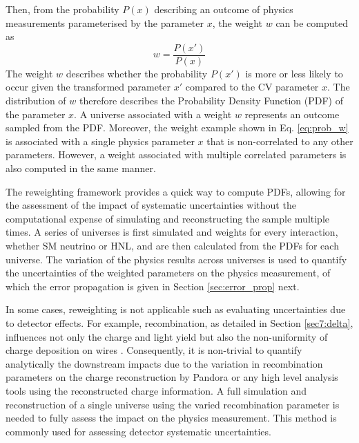 
Then, from the probability $P(x)$ describing an outcome of physics measurements parameterised by the parameter $x$, the weight $w$ can be computed as
\begin{equation}
\label{eq:prob_w}
	w = \frac{P(x')}{P(x)}
\end{equation}
The weight $w$ describes whether the probability $P(x')$ is more or less likely to occur given the transformed parameter $x'$ compared to the CV parameter $x$.
The distribution of $w$ therefore describes the Probability Density Function (PDF) of the parameter $x$.
A universe associated with a weight $w$ represents an outcome sampled from the PDF.
Moreover, the weight example shown in Eq. \ref{eq:prob_w} is associated with a single physics parameter $x$ that is non-correlated to any other parameters.
However, a weight associated with multiple correlated parameters is also computed in the same manner.

The reweighting framework provides a quick way to compute PDFs, allowing for the assessment of the impact of systematic uncertainties without the computational expense of simulating and reconstructing the sample multiple times.
A series of universes is first simulated and weights for every interaction, whether SM neutrino or HNL, and are then calculated from the PDFs for each universe.
The variation of the physics results across universes is used to quantify the uncertainties of the weighted parameters on the physics measurement, of which the error propagation is given in Section \ref{sec:error_prop} next.

In some cases, reweighting is not applicable such as evaluating uncertainties due to detector effects.
For example, recombination, as detailed in Section \ref{sec7:delta}, influences not only the charge and light yield but also the non-uniformity of charge deposition on wires \cite{TODO}. 
Consequently, it is non-trivial to quantify analytically the downstream impacts due to the variation in recombination parameters on the charge reconstruction by Pandora or any high level analysis tools using the reconstructed charge information.
A full simulation and reconstruction of a single universe using the varied recombination parameter is needed to fully assess the impact on the physics measurement. 
This method is commonly used for assessing detector systematic uncertainties.

